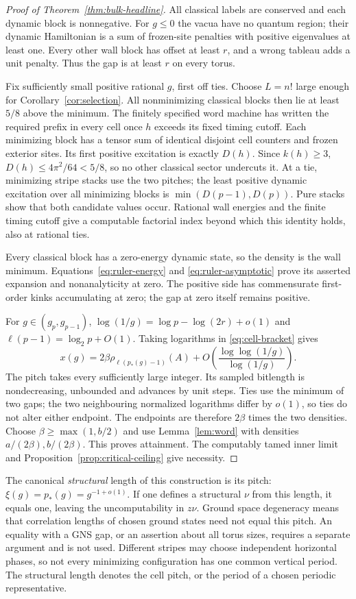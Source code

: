 \begin{proof}[Proof of Theorem~\ref{thm:bulk-headline}]
All classical labels are conserved and each dynamic block is
nonnegative. For $g\leq0$ the vacua have no quantum region; their
dynamic Hamiltonian is a sum of frozen-site penalties with positive
eigenvalues at least one. Every other wall block has offset at least
$r$, and a wrong tableau adds a unit penalty. Thus the gap is at least
$r$ on every torus.

Fix sufficiently small positive rational $g$, first off ties. Choose
$L=n!$ large enough for Corollary~\ref{cor:selection}. All nonminimizing
classical blocks then lie at least $5/8$ above the minimum. The finitely
specified word machine has written the required prefix in every cell
once $h$ exceeds its fixed timing cutoff. Each minimizing block has a
tensor sum of identical disjoint cell counters and frozen exterior
sites. Its first positive excitation is exactly $D(h)$. Since
$k(h)\geq3$, $D(h)\leq4\pi^2/64<5/8$, so no other classical sector
undercuts it. At a tie, minimizing stripe stacks use the two pitches;
the least positive dynamic excitation over all minimizing blocks is
$\min(D(p-1),D(p))$. Pure stacks show that both candidate values occur.
Rational wall energies and the finite timing cutoff give a computable
factorial index beyond which this identity holds, also at rational ties.

Every classical block has a zero-energy dynamic state, so the density
is the wall minimum. Equations~\eqref{eq:ruler-energy} and
\eqref{eq:ruler-asymptotic} prove its asserted expansion and
nonanalyticity at zero. The positive side has commensurate first-order
kinks accumulating at zero; the gap at zero itself remains positive.

For $g\in(g_p,g_{p-1})$,
$\log(1/g)=\log p-\log(2r)+o(1)$ and
$\ell(p-1)=\log_2p+O(1)$. Taking logarithms in
\eqref{eq:cell-bracket} gives
\[
 x(g)=2\beta\rho_{\ell(p_*(g)-1)}(A)
       +O\!\left(\frac{\log\log(1/g)}{\log(1/g)}\right).
\]
The pitch takes every sufficiently large integer. Its sampled bitlength
is nondecreasing, unbounded and advances by unit steps. Ties use the
minimum of two gaps; the two neighbouring normalized logarithms differ
by $o(1)$, so ties do not alter either endpoint. The endpoints are
therefore $2\beta$ times the two densities. Choose
$\beta\geq\max(1,b/2)$ and use Lemma~\ref{lem:word} with densities
$a/(2\beta),b/(2\beta)$. This proves attainment. The computably tamed
inner limit and Proposition~\ref{prop:critical-ceiling} give necessity.
\end{proof}

The canonical \emph{structural} length of this construction is its pitch:
$\xi(g)=p_*(g)=g^{-1+o(1)}$. If one defines a structural $\nu$ from this
length, it equals one, leaving the uncomputability in $z\nu$. Ground
space degeneracy means that correlation lengths of chosen ground states
need not equal this pitch. An equality with a GNS gap, or an assertion
about all torus sizes, requires a separate argument and is not used.
Different stripes may choose independent horizontal phases, so not
every minimizing configuration has one common vertical period.
The structural length denotes the cell pitch, or the period of
a chosen periodic representative.
